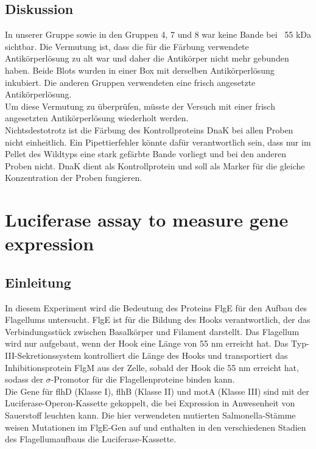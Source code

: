 \documentclass[oneside,10pt,a4paper]{report}
\begin{document}
			\subsection{Diskussion}
			
		In unserer Gruppe sowie in den Gruppen 4, 7 und 8 war keine Bande bei ~55 kDa sichtbar. Die Vermutung ist, dass die für die Färbung verwendete Antikörperlösung zu alt war und daher die Antikörper nicht mehr gebunden haben. Beide Blots wurden in einer Box mit derselben Antikörperlösung inkubiert. Die anderen Gruppen verwendeten eine frisch angesetzte Antikörperlösung. \\
		Um diese Vermutung zu überprüfen, müsste der Versuch mit einer frisch angesetzten Antikörperlösung wiederholt werden.\\
		Nichtsdestotrotz ist die Färbung des Kontrollproteins DnaK bei allen Proben nicht einheitlich. Ein Pipettierfehler könnte dafür verantwortlich sein, dass nur im Pellet des Wildtyps eine stark gefärbte Bande vorliegt und bei den anderen Proben nicht. DnaK dient als Kontrollprotein und soll als Marker für die gleiche Konzentration der Proben fungieren.
			
			
		\section{Luciferase assay to measure gene expression}
		
			\subsection{Einleitung}
			In diesem Experiment wird die Bedeutung des Proteins FlgE für den Aufbau des Flagellums untersucht. FlgE ist für die Bildung des Hooks verantwortlich, der das Verbindungsstück zwischen Basalkörper und Filament darstellt. Das Flagellum wird nur aufgebaut, wenn der Hook eine Länge von 55 nm erreicht hat. Das Typ-III-Sekretionssystem kontrolliert die Länge des Hooks und transportiert das Inhibitionsprotein FlgM aus der Zelle, sobald der Hook die 55 nm erreicht hat, sodass der $\sigma$-Promotor für die Flagellenproteine binden kann.\\
			Die Gene für flhD (Klasse I), flhB (Klasse II) und motA (Klasse III) sind mit der Luciferase-Operon-Kassette gekoppelt, die bei Expression in Anwesenheit von Sauerstoff leuchten kann. Die hier verwendeten mutierten Salmonella-Stämme weisen Mutationen im FlgE-Gen auf und enthalten in den verschiedenen Stadien des Flagellumaufbaus die Luciferase-Kassette.
			
\end{document}
